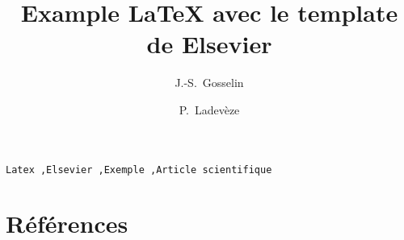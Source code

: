 



\begin{frontmatter} 

\title{Example \LaTeX{} avec le template de Elsevier}

\author[inrs]{J.-S.~Gosselin}
\author[cgc]{P.~Ladevèze}

\address[inrs]{Institut national de la recherche scientifique, Centre Eau Terre Environnement, 490 rue de la Couronne, Quebec City, Quebec, Canada}
\address[cgc]{Geological Survey of Canada, Quebec Division, 490 rue de la Couronne, Quebec City, Quebec, Canada}

\begin{abstract}
    
\end{abstract}

\begin{keyword}
    \texttt{Latex \sep  Elsevier \sep Exemple \sep Article scientifique}
\end{keyword}
  
\end{frontmatter}

\linenumbers









\section*{Références} 



